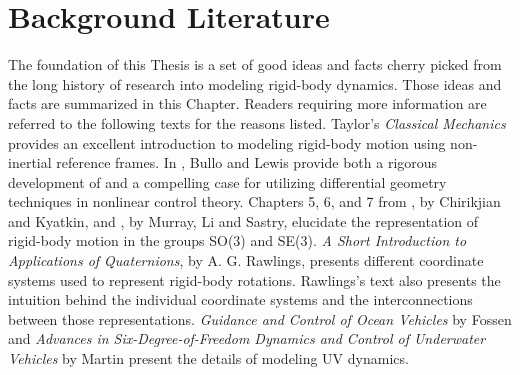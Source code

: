 \section{Background Literature}
\label{chModels.sec.litReview}

%
The foundation of this Thesis is a set of good ideas and facts cherry
picked from the long history of research into modeling rigid-body
dynamics.
%
Those ideas and facts are summarized in this Chapter.
%
Readers requiring more information are referred to the following texts
for the reasons listed.
%
Taylor's {\it Classical Mechanics}\cite{Taylor2005} provides an
excellent introduction to modeling rigid-body motion using
non-inertial reference frames.
%
In \cite{Bullo2004}, Bullo and Lewis provide both a rigorous
development of and a compelling case for utilizing differential
geometry techniques in nonlinear control theory.
%
Chapters 5, 6, and 7 from \cite{Chirikjian2000}, by Chirikjian and
Kyatkin, and \cite{murray&li&sastry}, by Murray, Li and Sastry,
elucidate the representation of rigid-body motion in the groups SO(3)
and SE(3).
%
{\it A Short Introduction to Applications of Quaternions}, by
A. G. Rawlings\cite{RawlingQuaternions}, presents different coordinate
systems used to represent rigid-body rotations.
%
Rawlings's text also presents the intuition behind the individual
coordinate systems and the interconnections between those
representations.
%
{\it Guidance and Control of Ocean Vehicles} by
Fossen\cite{fossen} and {\it Advances in Six-Degree-of-Freedom
  Dynamics and Control of Underwater Vehicles} by
Martin\cite{martin.thesis} present the details of modeling \acf{UV}
dynamics.


